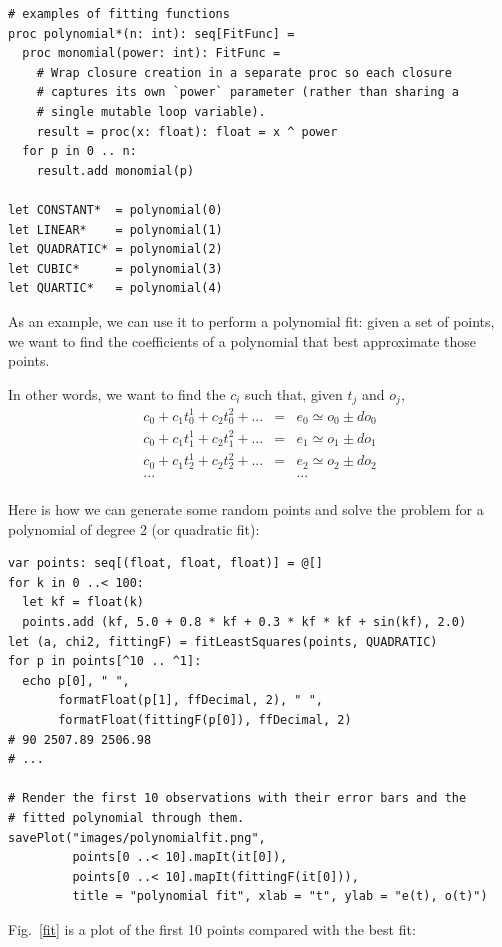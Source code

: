 \documentclass[justified, sixbynine]{tufte-book}
\def\ft{\small\tt}
\theoremstyle{plain}%
\newtheorem * {corollary}{Corollary}
\theoremstyle{definition}
\theoremstyle{remark}
\newtheorem * {remark}{Remark}
\newtheorem * {note}{Note}
\begin{document}
\begin{fullwidth}
\begin{lstlisting}[caption={in file: {\ft nlib/fitting.nim}}]
# examples of fitting functions
proc polynomial*(n: int): seq[FitFunc] =
  proc monomial(power: int): FitFunc =
    # Wrap closure creation in a separate proc so each closure
    # captures its own `power` parameter (rather than sharing a
    # single mutable loop variable).
    result = proc(x: float): float = x ^ power
  for p in 0 .. n:
    result.add monomial(p)

let CONSTANT*  = polynomial(0)
let LINEAR*    = polynomial(1)
let QUADRATIC* = polynomial(2)
let CUBIC*     = polynomial(3)
let QUARTIC*   = polynomial(4)
\end{lstlisting}

As an example, we can use it to perform a polynomial fit: given a set of points, we want to find the coefficients of a polynomial that best approximate those points.

In other words, we want to find the $c_i$ such that, given $t_j$ and $o_j$,
\begin{eqnarray}
c_0  + c_1 t_0^{1} + c_2 t_0^{2} +  ... & = & e_0 \simeq o_0 \pm do_0 \\
c_0  + c_1 t_1^{1} + c_2 t_1^{2} +  ... & = & e_1 \simeq o_1 \pm do_1\\
c_0  + c_1 t_2^{1} + c_2 t_2^{2} +  ... & = & e_2 \simeq o_2 \pm do_2\\
... &  &... \\
\end{eqnarray}

Here is how we can generate some random points and solve the problem for a polynomial of degree 2 (or quadratic fit):

\begin{lstlisting}
var points: seq[(float, float, float)] = @[]
for k in 0 ..< 100:
  let kf = float(k)
  points.add (kf, 5.0 + 0.8 * kf + 0.3 * kf * kf + sin(kf), 2.0)
let (a, chi2, fittingF) = fitLeastSquares(points, QUADRATIC)
for p in points[^10 .. ^1]:
  echo p[0], " ",
       formatFloat(p[1], ffDecimal, 2), " ",
       formatFloat(fittingF(p[0]), ffDecimal, 2)
# 90 2507.89 2506.98
# ...

# Render the first 10 observations with their error bars and the
# fitted polynomial through them.
savePlot("images/polynomialfit.png",
         points[0 ..< 10].mapIt(it[0]),
         points[0 ..< 10].mapIt(fittingF(it[0])),
         title = "polynomial fit", xlab = "t", ylab = "e(t), o(t)")
\end{lstlisting}

Fig.~\ref{fit} is a plot of the first 10 points compared with the best fit:


\end{fullwidth}
\end{document}
